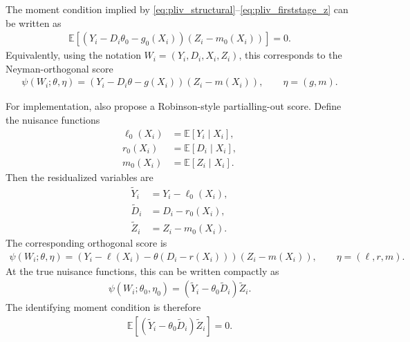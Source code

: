 \documentclass[12pt,a4paper]{article}
\newcommand{\E}{\mathbb{E}}
\begin{document}
The moment condition implied by \eqref{eq:pliv_structural}--\eqref{eq:pliv_firststage_z}
can be written as
\begin{align}
    \E
    \left[
        \left(Y_i - D_i \theta_0 - g_0(X_i)\right)
        \left(Z_i - m_0(X_i)\right)
    \right]
    = 0.
    \label{eq:pliv_moment_g}
\end{align}
Equivalently, using the notation \(W_i=(Y_i,D_i,X_i,Z_i)\), this corresponds to the
Neyman-orthogonal score
\begin{align}
    \psi(W_i;\theta,\eta)
    =
    \left(Y_i - D_i\theta - g(X_i)\right)
    \left(Z_i - m(X_i)\right),
    \qquad
    \eta=(g,m).
    \label{eq:pliv_score_g}
\end{align}

For implementation, \citet{chernozhukov2018double} also propose a Robinson-style
partialling-out score. Define the nuisance functions
\begin{align}
    \ell_0(X_i) &= \E[Y_i \mid X_i], \label{eq:nuisance_l} \\
    r_0(X_i) &= \E[D_i \mid X_i], \label{eq:nuisance_r} \\
    m_0(X_i) &= \E[Z_i \mid X_i]. \label{eq:nuisance_m}
\end{align}
Then the residualized variables are
\begin{align}
    \widetilde{Y}_i &= Y_i - \ell_0(X_i), \label{eq:y_tilde_pliv} \\
    \widetilde{D}_i &= D_i - r_0(X_i), \label{eq:d_tilde_pliv} \\
    \widetilde{Z}_i &= Z_i - m_0(X_i). \label{eq:z_tilde_pliv}
\end{align}
The corresponding orthogonal score is
\begin{align}
    \psi(W_i;\theta,\eta)
    =
    \left(
        Y_i - \ell(X_i)
        -
        \theta\left(D_i-r(X_i)\right)
    \right)
    \left(
        Z_i-m(X_i)
    \right),
    \qquad
    \eta=(\ell,r,m).
    \label{eq:pliv_robinson_score}
\end{align}
At the true nuisance functions, this can be written compactly as
\begin{align}
    \psi(W_i;\theta_0,\eta_0)
    =
    \left(
        \widetilde{Y}_i
        -
        \theta_0 \widetilde{D}_i
    \right)
    \widetilde{Z}_i.
    \label{eq:pliv_residual_score}
\end{align}
The identifying moment condition is therefore
\begin{align}
    \E
    \left[
        \left(
            \widetilde{Y}_i
            -
            \theta_0 \widetilde{D}_i
        \right)
        \widetilde{Z}_i
    \right]
    = 0.
    \label{eq:pliv_residual_moment}
\end{align}
\end{document}
